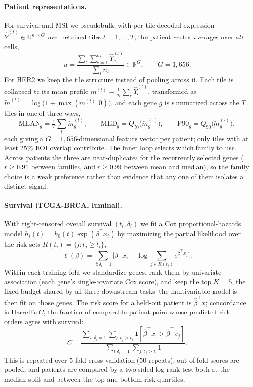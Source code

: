 \documentclass[11pt]{article}
\begin{document}
\paragraph{Patient representations.} For survival and MSI we pseudobulk: with
per-tile decoded expression $\hat Y^{(t)}\in\mathbb{R}^{n_t\times G}$ over
retained tiles $t=1,\dots,T$, the patient vector averages over \emph{all} cells,
\[
u=\frac{\sum_{t}\sum_{c=1}^{n_t}\hat Y^{(t)}_{c,:}}{\sum_t n_t}\in\mathbb{R}^{G},
\qquad G=1{,}656 .
\]
For HER2 we keep the tile structure instead of pooling across it. Each tile is
collapsed to its mean profile $m^{(t)}=\tfrac{1}{n_t}\sum_c \hat Y^{(t)}_{c,:}$,
transformed as $\tilde m^{(t)}=\log\!\big(1+\max(m^{(t)},0)\big)$, and each gene
$g$ is summarized across the $T$ tiles in one of three ways,
\[
\mathrm{MEAN}_g=\tfrac{1}{T}\textstyle\sum_t\tilde m^{(t)}_g,
\qquad
\mathrm{MED}_g=Q_{50}\big(\tilde m^{(\cdot)}_g\big),
\qquad
\mathrm{P90}_g=Q_{90}\big(\tilde m^{(\cdot)}_g\big),
\]
each giving a $G=1{,}656$-dimensional feature vector per patient; only tiles with
at least $25\%$ ROI overlap contribute. The inner loop selects which family to
use. Across patients the three are near-duplicates for the recurrently selected
genes ($r\ge0.91$ between families, and $r\ge0.99$ between mean and median), so
the family choice is a weak preference rather than evidence that any one of them
isolates a distinct signal.

\paragraph{Survival (TCGA-BRCA, luminal).} With right-censored overall survival
$(t_i,\delta_i)$ we fit a Cox proportional-hazards model
$h_i(t)=h_0(t)\exp(\beta^{\top}x_i)$ by maximizing the partial likelihood over
the risk sets $R(t_i)=\{j:t_j\ge t_i\}$,
\[
\ell(\beta)=\sum_{i:\delta_i=1}\Big[\beta^{\top}x_i
-\log\!\!\sum_{j\in R(t_i)} e^{\beta^{\top}x_j}\Big].
\]
Within each training fold we standardize genes, rank them by univariate
association (each gene's single-covariate Cox score), and keep the top
$K=5$, the fixed budget shared by all three downstream tasks; the multivariable
model is then fit on those genes. The
risk score for a held-out patient is
$\hat\beta^{\top}x$; concordance is Harrell's $C$, the fraction of comparable
patient pairs whose predicted risk orders agree with survival:
\[
C=\frac{\sum_{i:\delta_i=1}\sum_{j:t_j>t_i}\mathbf{1}\!\left[\hat\beta^{\top}x_i>\hat\beta^{\top}x_j\right]}
{\sum_{i:\delta_i=1}\sum_{j:t_j>t_i}1}.
\]
This is repeated over $5$-fold cross-validation ($50$ repeats); out-of-fold
scores are pooled, and patients are compared by a two-sided log-rank test both
at the median split and between the top and bottom risk quartiles.
\end{document}
